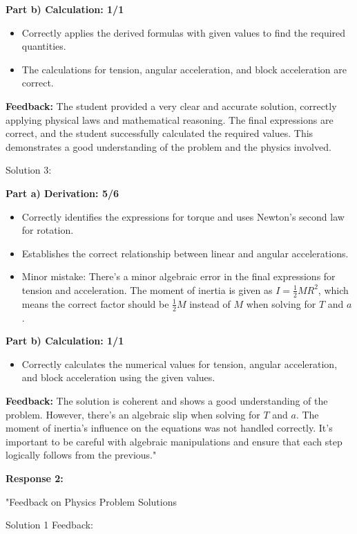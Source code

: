 \documentclass[a4paper,11pt]{article}
\begin{document}
\textbf{Part b) Calculation: 1/1}
\begin{itemize}
  \item Correctly applies the derived formulas with given values to find the required quantities.
  \item The calculations for tension, angular acceleration, and block acceleration are correct.
\end{itemize}

\textbf{Feedback:}
The student provided a very clear and accurate solution, correctly applying physical laws and mathematical reasoning. The final expressions are correct, and the student successfully calculated the required values. This demonstrates a good understanding of the problem and the physics involved.

Solution 3:

\textbf{Part a) Derivation: 5/6}
\begin{itemize}
  \item Correctly identifies the expressions for torque and uses Newton's second law for rotation.
  \item Establishes the correct relationship between linear and angular accelerations.
  \item Minor mistake: There's a minor algebraic error in the final expressions for tension and acceleration. The moment of inertia is given as \( I = \frac{1}{2} M R^2 \), which means the correct factor should be \( \frac{1}{2} M \) instead of \( M \) when solving for \( T \) and \( a \).
\end{itemize}

\textbf{Part b) Calculation: 1/1}
\begin{itemize}
  \item Correctly calculates the numerical values for tension, angular acceleration, and block acceleration using the given values.
\end{itemize}

\textbf{Feedback:}
The solution is coherent and shows a good understanding of the problem. However, there's an algebraic slip when solving for \( T \) and \( a \). The moment of inertia's influence on the equations was not handled correctly. It's important to be careful with algebraic manipulations and ensure that each step logically follows from the previous."

\textbf{Response 2:}

"Feedback on Physics Problem Solutions

Solution 1 Feedback:
\end{document}
